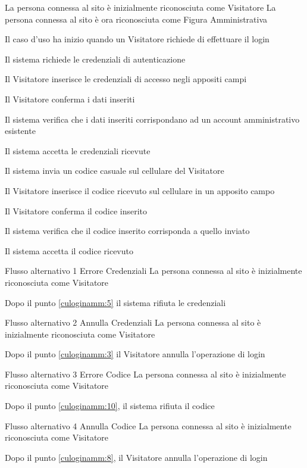 
%
{}%
{La persona connessa al sito è inizialmente riconosciuta come Visitatore}%
{La persona connessa al sito è ora riconosciuta come Figura Amministrativa}%
{\begin{enumCU}
	\item Il caso d'uso ha inizio quando un Visitatore richiede di effettuare il login 
	\item Il sistema richiede le credenziali di autenticazione
	\item Il Visitatore inserisce le credenziali di accesso negli appositi campi \label{culoginamm:3}
	\item Il Visitatore conferma i dati inseriti
	\item Il sistema verifica che i dati inseriti corrispondano ad un account amministrativo esistente\label{culoginamm:5}
	\item Il sistema accetta le credenziali ricevute
	\item Il sistema invia un codice casuale sul cellulare del Visitatore
	\item Il Visitatore inserisce il codice ricevuto sul cellulare in un apposito campo \label{culoginamm:8}
	\item Il Visitatore conferma il codice inserito
	\item Il sistema verifica che il codice inserito corrisponda a quello inviato \label{culoginamm:10}
	\item Il sistema accetta il codice ricevuto
\end{enumCU}}%
%
{Flusso alternativo 1}%
{Errore Credenziali}%
{La persona connessa al sito è inizialmente riconosciuta come Visitatore}%
{\postNulle}%
{\begin{enumCU}
	\item Dopo il punto \ref{culoginamm:5} il sistema rifiuta le credenziali
\end{enumCU}}%
%
{Flusso alternativo 2}%
{Annulla Credenziali}%
{La persona connessa al sito è inizialmente riconosciuta come Visitatore}%
{\postNulle}%
{\begin{enumCU}
		\item Dopo il punto \ref{culoginamm:3} il Visitatore annulla l'operazione di login
\end{enumCU}}%
%
{Flusso alternativo 3}%
{Errore Codice}%
{La persona connessa al sito è inizialmente riconosciuta come Visitatore}%
{\postNulle}%
{\begin{enumCU}
		\item Dopo il punto \ref{culoginamm:10}, il sistema rifiuta il codice
\end{enumCU}}%
%
{Flusso alternativo 4}%
{Annulla Codice}%
{La persona connessa al sito è inizialmente riconosciuta come Visitatore}%
{\postNulle}%
{\begin{enumCU}
		\item Dopo il punto \ref{culoginamm:8}, il Visitatore annulla l'operazione di login
\end{enumCU}}%

